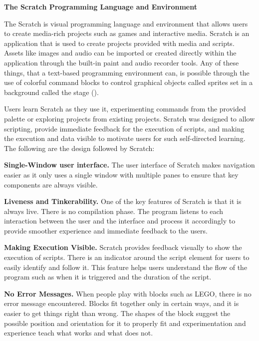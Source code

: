 \flushleft
\textbf{The Scratch Programming Language and Environment}\\
\justifying

\parx
The Scratch is visual programming language and environment that allows users to
create media-rich projects such as games and interactive media. Scratch is an
application that is used to create projects provided with media and scripts.
Assets like images and audio can be imported or created directly within the
application through the built-in paint and audio recorder tools. Any of these
things, that a text-based programming environment can, is possible through the
use of colorful command blocks to control graphical objects called sprites set
in a background called the stage
(\cite{maloney_resnick_rusk_silverman_eastmond_2010}).

\parx
Users learn Scratch as they use it, experimenting commands from the provided
palette or exploring projects from existing projects. Scratch was designed to
allow scripting, provide immediate feedback for the execution of scripts, and
making the execution and data visible to motivate users for such self-directed
learning. The following are the design followed by Scratch:

\parx
\textbf{Single-Window user interface.}
The user interface of Scratch makes
navigation easier as it only uses a single window with multiple panes to ensure
that key components are always visible.

\parx
\textbf{Liveness and Tinkerability.}
One of the key features of Scratch is that it is always live. There is no
compilation phase. The program listens to each interaction between the user and
the interface and process it accordingly to provide smoother experience and
immediate feedback to the users.

\parx
\textbf{Making Execution Visible.}
Scratch provides feedback visually to show the execution of scripts. There is an
indicator around the script element for users to easily identify and follow it.
This feature helps users understand the flow of the program such as when it is
triggered and the duration of the script.

\parx
\textbf{No Error Messages.}
When people play with blocks such as LEGO, there is no error message
encountered. Blocks fit together only in certain ways, and it is easier to get
things right than wrong. The shapes of the block suggest the possible position
and orientation for it to properly fit and experimentation and experience teach
what works and what does not.

